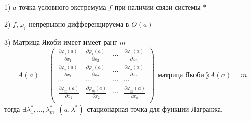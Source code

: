 \begin{theorem}
  1) $a$ точка условного экстремума $f$ при наличии связи системы $*$

  2) $f, \varphi_i$ непрерывно дифференцируема в $O(a)$

  3) Матрица Якоби имеет имеет ранг $m$
  $$
  A(a) =
  \left(
  \begin{array}{cccc}
    \frac{\partial \varphi_1(a)}{\partial x_1} &
    \frac{\partial \varphi_1(a)}{\partial x_2} &
    \cdots &
    \frac{\partial \varphi_1(a)}{\partial x_n} \\

    \frac{\partial \varphi_2(a)}{\partial x_1} &
    \frac{\partial \varphi_2(a)}{\partial x_2} &
    \cdots &
    \frac{\partial \varphi_2(a)}{\partial x_n} \\
    \cdots & \cdots & \cdots & \cdots \\

    \frac{\partial \varphi_m(a)}{\partial x_1} &
    \frac{\partial \varphi_m(a)}{\partial x_2} &
    \cdots &
    \frac{\partial \varphi_m(a)}{\partial x_n} \\
  \end{array}
  \right) ~~ \text{матрица Якоби} ~ \rang A(a) = m
  $$
  тогда $\exists \lambda^*_1, \ldots, \lambda^*_m ~~ (a, \lambda^*)$
  стационарная точка для функции Лагранжа.
\end{theorem}

